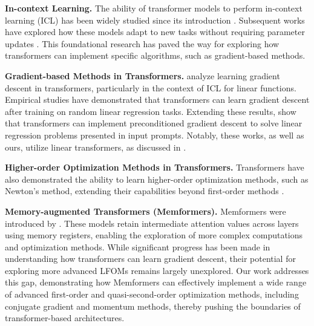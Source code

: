 \textbf{In-context Learning.} The ability of transformer models to perform in-context learning (ICL) has been widely studied since its introduction \cite{NEURIPS2020_1457c0d6}. Subsequent works have explored how these models adapt to new tasks without requiring parameter updates \cite{xie2022explanationincontextlearningimplicit, vonoswald2024uncoveringmesaoptimizationalgorithmstransformers, hahn2023theoryemergentincontextlearning, liu2021makesgoodincontextexamples, lu2022fantasticallyorderedpromptsthem, NEURIPS2022_9d560961, wu2023selfadaptiveincontextlearninginformation}. This foundational research has paved the way for exploring how transformers can implement specific algorithms, such as gradient-based methods.

\textbf{Gradient-based Methods in Transformers.} \cite{garg2022can} analyze learning gradient descent in transformers, particularly in the context of ICL for linear functions. Empirical studies \cite{garg2022can, akyurek2022learning, pmlr-v202-von-oswald23a} have demonstrated that transformers can learn gradient descent after training on random linear regression tasks. Extending these results, \cite{pmlr-v202-von-oswald23a, ahn2023transformerslearnimplementpreconditioned} show that transformers can implement preconditioned gradient descent to solve linear regression problems presented in input prompts. Notably, these works, as well as ours, utilize linear transformers, as discussed in \cite{schlag2021lineartransformerssecretlyfast, pmlr-v202-von-oswald23a, ahn2023linear}.

\textbf{Higher-order Optimization Methods in Transformers.} Transformers have also demonstrated the ability to learn higher-order optimization methods, such as Newton's method, extending their capabilities beyond first-order methods \cite{fu2023transformerslearnachievesecondorder, giannou2024transformersemulateincontextnewtons, vladymyrov2024lineartransformersversatileincontext}.

\textbf{Memory-augmented Transformers (Memformers).} Memformers were introduced by \cite{wu2022memformermemoryaugmentedtransformersequence, Xu_Liang_Cheng_Wei_Chen_Zhang_2021, dutta2024memoryaugmentedtransformersimplementlinear}. These models retain intermediate attention values across layers using memory registers, enabling the exploration of more complex computations and optimization methods. While significant progress has been made in understanding how transformers can learn gradient descent, their potential for exploring more advanced LFOMs remains largely unexplored. Our work addresses this gap, demonstrating how Memformers can effectively implement a wide range of advanced first-order and quasi-second-order optimization methods, including conjugate gradient and momentum methods, thereby pushing the boundaries of transformer-based architectures.
